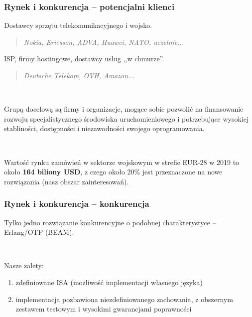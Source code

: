 \documentclass{beamer}
\begin{document}
\begin{frame}
    \frametitle{Rynek i konkurencja -- potencjalni klienci}

    Dostawcy sprzętu telekomunikacyjnego i wojsko.

    \begin{quote}
        \begin{small}
            \emph{Nokia, Ericsson, ADVA, Huawei, NATO, uczelnie...}
        \end{small}
    \end{quote}

    ISP, firmy hostingowe, dostawcy usług ,,w chmurze''.

    \begin{quote}
        \begin{small}
            \emph{Deutsche Telekom, OVH, Amazon...}
        \end{small}
    \end{quote}

    ~

    Grupą docelową są firmy i organizacje, mogące sobie pozwolić na finansowanie
    rozwoju specjalistycznego środowiska uruchomieniowego i potrzebujące
    wysokiej stabliności, dostępności i niezawodności swojego oprogramowania.

    ~

    Wartość rynku zamówień w sektorze wojskowym w strefie EUR-28 w 2019 to około
    \textbf{164 biliony USD}, z czego około 20\% jest przeznaczone na nowe rozwiązania
    (nasz obszar zainteresowań).
\end{frame}

\begin{frame}
    \frametitle{Rynek i konkurencja -- konkurencja}

    Tylko jedno rozwiązanie konkurencyjne o podobnej charakterystyce --
    Erlang/OTP (BEAM).

    ~

    Nasze zalety:

    \begin{enumerate}
        \item zdefiniowane ISA (możliwość implementacji własnego języka)
        \item implementacja pozbawiona niezdefiniowanego zachowania, z obszernym
            zestawem testowym i wysokimi gwarancjami poprawności
    \end{enumerate}
\end{frame}
\end{document}
